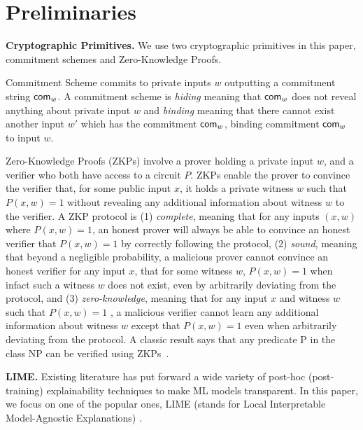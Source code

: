 \section{Preliminaries}\label{sec:prelims}

\textbf{Cryptographic Primitives.} We use two cryptographic primitives in this paper, commitment schemes and Zero-Knowledge Proofs.

Commitment Scheme \cite{blum1983coin} commits to private inputs $w$ outputting a commitment string $\textsf{com}_w$. A commitment scheme is \textit{hiding} meaning that $\textsf{com}_w$ does not reveal anything about private input $w$ and \textit{binding} meaning that there cannot exist another input $w'$ which has the commitment $\textsf{com}_w$, binding commitment $\textsf{com}_w$ to input $w$.

Zero-Knowledge Proofs (ZKPs) \cite{GMR, GMW} involve a prover holding a private input $w$, and a verifier who both have access to a circuit $P$. ZKPs enable the prover to convince the verifier that, for some public input $x$, it holds a private witness $w$ such that $P(x, w)=1$ without revealing any additional information about witness $w$ to the verifier. A ZKP protocol is (1) \textit{complete}, meaning that for any inputs $(x, w)$ where $P(x, w)=1$, an honest prover will always be able to convince an honest verifier that $P(x, w)=1$ by correctly following the protocol, (2) \textit{sound}, meaning that beyond a negligible probability, a malicious prover cannot convince an honest verifier for any input $x$, that for some witness $w$, $P(x, w)=1$ when infact such a witness $w$ does not exist, even by arbitrarily deviating from the protocol, and (3) \textit{zero-knowledge}, meaning that for any input $x$ and witness $w$ such that $P(x, w)=1$ , a malicious verifier cannot learn any additional information about witness $w$ except that $P(x, w)=1$ even when arbitrarily deviating from the protocol. A classic result says that any predicate P in the class NP can be verified using ZKPs~\cite{GMW}.


\textbf{LIME.} Existing literature has put forward a wide variety of post-hoc (post-training) explainability techniques to make ML models transparent. In this paper, we focus on one of the popular ones, LIME (stands for Local Interpretable Model-Agnostic Explanations)  \cite{ribeiro2016should}.

